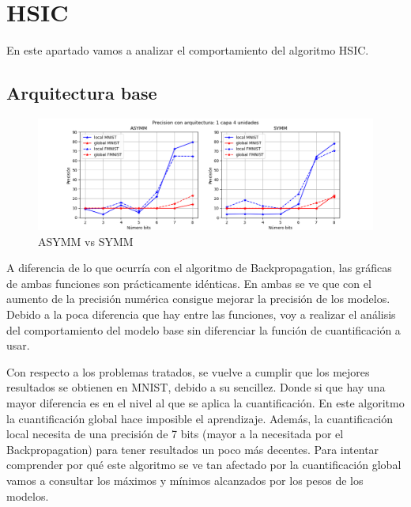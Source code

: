 \newpage
\section{HSIC}
En este apartado vamos a analizar el comportamiento del algoritmo HSIC.

\subsection{Arquitectura base}

\begin{figure}[H]
    \centering
    \includegraphics[width=\textwidth]{imagenes/HSIC/Precision con arquitectura: 1 capa 4 unidades.png}
    \caption{ASYMM vs SYMM}
    \label{fig:asymmvssymmHSIC}
\end{figure}

A diferencia de lo que ocurría con el algoritmo de Backpropagation, las gráficas de ambas funciones son prácticamente idénticas. En ambas se ve que con el aumento de la precisión numérica consigue mejorar la precisión de los modelos. Debido a la poca diferencia que hay entre las funciones, voy a realizar el análisis del comportamiento del modelo base sin diferenciar la función de cuantificación a usar.

Con respecto a los problemas tratados, se vuelve a cumplir que los mejores resultados se obtienen en MNIST, debido a su sencillez. Donde si que hay una mayor diferencia es en el nivel al que se aplica la cuantificación. En este algoritmo la cuantificación global hace imposible el aprendizaje. Además, la cuantificación local necesita de una precisión de 7 bits (mayor a la necesitada por el Backpropagation) para tener resultados un poco más decentes. Para intentar comprender por qué este algoritmo se ve tan afectado por la cuantificación global vamos a consultar los máximos y mínimos alcanzados por los pesos de los modelos.

